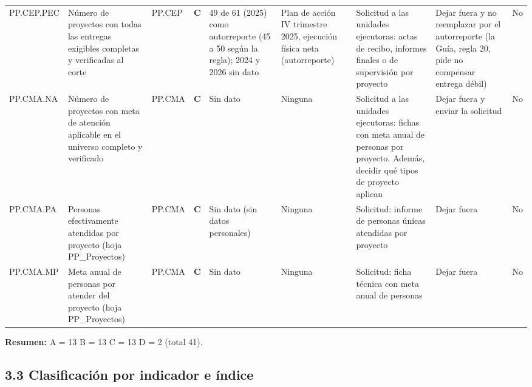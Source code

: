 \documentclass[11pt,letterpaper]{article}
\newcommand{\pagsize}{\special{papersize=21.59cm,27.94cm}}
\begin{document}
{\begin{xltabular}{\linewidth}{L{1.94cm}L{2.56cm}L{2.04cm}L{1.12cm}L{2.87cm}L{2.87cm}L{2.71cm}L{2.77cm}L{2.04cm}}
PP.CEP.PEC & Número de proyectos con todas las entregas exigibles completas y verificadas al corte & PP.CEP & \textbf{C} & 49 de 61 (2025) como autorreporte (45 a 50 según la regla); 2024 y 2026 sin dato & Plan de acción IV trimestre 2025, ejecución física neta (autorreporte) & Solicitud a las unidades ejecutoras: actas de recibo, informes finales o de supervisión por proyecto & Dejar fuera y no reemplazar por el autorreporte (la Guía, regla 20, pide no compensar entrega débil) & No \\
PP.CMA.NA & Número de proyectos con meta de atención aplicable en el universo completo y verificado & PP.CMA & \textbf{C} & Sin dato & Ninguna & Solicitud a las unidades ejecutoras: fichas con meta anual de personas por proyecto. Además, decidir qué tipos de proyecto aplican & Dejar fuera y enviar la solicitud & No \\
PP.CMA.PA & Personas efectivamente atendidas por proyecto (hoja PP\_Proyectos) & PP.CMA & \textbf{C} & Sin dato (sin datos personales) & Ninguna & Solicitud: informe de personas únicas atendidas por proyecto & Dejar fuera & No \\
PP.CMA.MP & Meta anual de personas por atender del proyecto (hoja PP\_Proyectos) & PP.CMA & \textbf{C} & Sin dato & Ninguna & Solicitud: ficha técnica con meta anual de personas & Dejar fuera & No \\
\end{xltabular}
}

\textbf{Resumen:} A = 13 \textperiodcentered{} B = 13 \textperiodcentered{} C = 13 \textperiodcentered{} D = 2 (total 41).

\clearpage
\restoregeometry
\setlength{\headwidth}{\textwidth}
\renewcommand{\pagsize}{\special{papersize=21.59cm,27.94cm}}

\subsection*{3.3 Clasificación por indicador e índice}

\end{document}

